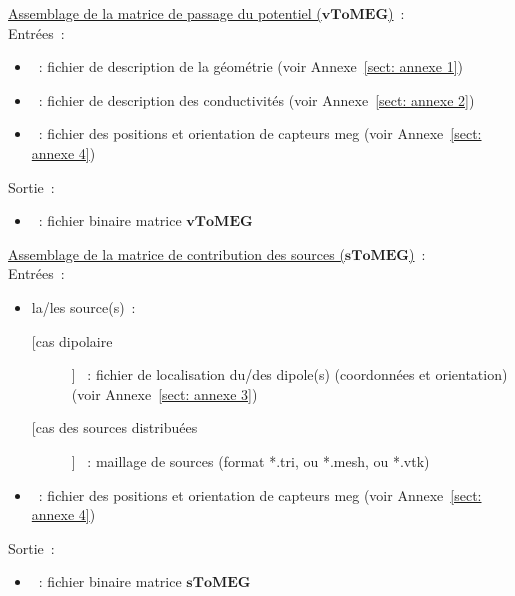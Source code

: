 \medskip

\noindent
\underline{Assemblage de la matrice de passage du potentiel ($\mathbf{vToMEG}$)}~:\\
Entrées~:
\begin{itemize}
    \item {}~: fichier de description de la géométrie (voir Annexe~\ref{sect: annexe 1})
    \item {}~: fichier de description des conductivités (voir Annexe~\ref{sect: annexe 2})
    \item {}~: fichier des positions et orientation de capteurs meg (voir Annexe~\ref{sect: annexe 4})
\end{itemize}
Sortie~:
\begin{itemize}
    \item {}~: fichier binaire matrice $\mathbf{vToMEG}$
\end{itemize}

\medskip

\noindent
{}

\bigskip

\noindent
\underline{Assemblage de la matrice de contribution des sources ($\mathbf{sToMEG}$)}~:\\
Entrées~:
\begin{itemize}
    \item la/les source(s)~:
    \begin{description}
        \item [[cas dipolaire]] ~: fichier de localisation du/des dipole(s) (coordonnées et orientation) (voir Annexe~\ref{sect: annexe 3}) 
        \item [[cas des sources distribuées]] ~: maillage de sources (format *.tri, ou *.mesh, ou *.vtk)
    \end{description}
    \item {}~: fichier des positions et orientation de capteurs meg (voir Annexe~\ref{sect: annexe 4})
\end{itemize}
Sortie~: 
\begin{itemize}
    \item {}~: fichier binaire matrice $\mathbf{sToMEG}$
\end{itemize}

